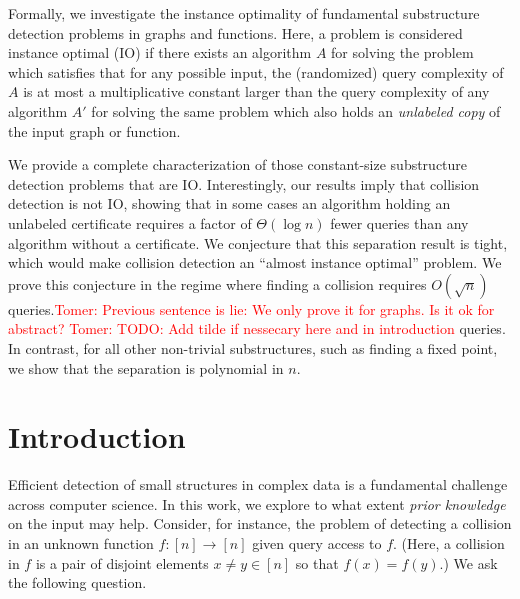 \documentclass[11pt]{article}
\numberwithin{equation}{section}
\newcommand{\1}{\mathbf{1}}
\newcommand\tomer[1]{{\textcolor{red}{Tomer: #1}}}
\begin{document}
Formally, we investigate the instance optimality of fundamental substructure detection problems in graphs and functions.
Here, a problem is considered instance optimal (IO) if there exists an algorithm 
$A$ for solving the problem which satisfies that for any possible input, the (randomized) query complexity of $A$ is at most a multiplicative constant larger than the query complexity of any algorithm $A'$ for solving the same problem which also holds an \emph{unlabeled copy} of the input graph or function.

We provide a complete characterization of those constant-size substructure detection problems that are IO. Interestingly, our results imply that collision detection is not IO, showing that in some cases an algorithm holding an unlabeled certificate requires a factor of $\Theta(\log n)$ fewer queries than any algorithm without a certificate. We conjecture that this separation result is tight, which would make collision detection an ``almost instance optimal'' problem. We prove this conjecture in the regime where finding a collision requires $O(\sqrt{n})$ queries.\tomer{Previous sentence is lie: We only prove it for graphs. Is it ok for abstract?}  \tomer{TODO: Add tilde if nessecary here and in introduction} queries. In contrast, for all other non-trivial substructures, such as finding a fixed point, we show that the separation is polynomial in $n$.
\fi







\section{Introduction}
\label{sec:intro}







Efficient detection of small structures in complex data is a fundamental challenge across computer science. 
In this work, we explore to what extent \emph{prior knowledge} on the input may help. Consider, for instance, the problem of detecting a collision in an unknown function $f\colon [n] \to [n]$ given query access to $f$. (Here, a collision in $f$ is a pair of disjoint elements $x \neq y \in [n]$ so that $f(x) = f(y)$.)
We ask the following question.
\end{document}
